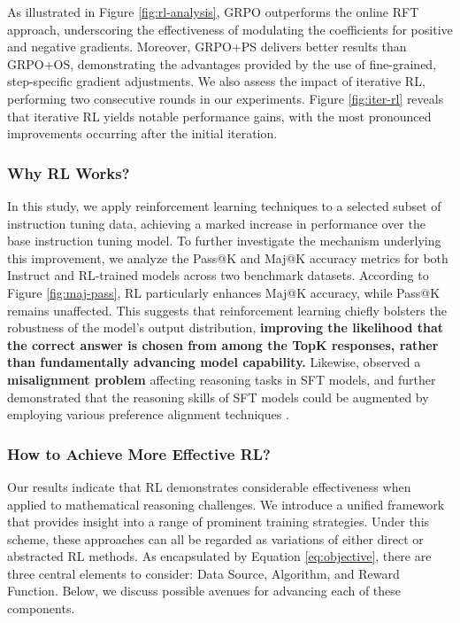 \begin{itemize}[topsep=0pt]
\begin{itemize}[topsep=0pt]
As illustrated in Figure \ref{fig:rl-analysis}, GRPO outperforms the online RFT approach, underscoring the effectiveness of modulating the coefficients for positive and negative gradients. Moreover, GRPO+PS delivers better results than GRPO+OS, demonstrating the advantages provided by the use of fine-grained, step-specific gradient adjustments. We also assess the impact of iterative RL, performing two consecutive rounds in our experiments. Figure \ref{fig:iter-rl} reveals that iterative RL yields notable performance gains, with the most pronounced improvements occurring after the initial iteration.

\subsubsection{Why RL Works?} In this study, we apply reinforcement learning techniques to a selected subset of instruction tuning data, achieving a marked increase in performance over the base instruction tuning model. To further investigate the mechanism underlying this improvement, we analyze the Pass@K and Maj@K accuracy metrics for both Instruct and RL-trained models across two benchmark datasets. According to Figure \ref{fig:maj-pass}, RL particularly enhances Maj@K accuracy, while Pass@K remains unaffected. This suggests that reinforcement learning chiefly bolsters the robustness of the model’s output distribution, \textbf{improving the likelihood that the correct answer is chosen from among the TopK responses, rather than fundamentally advancing model capability.} Likewise, \citep{wang2023making} observed a \textbf{misalignment problem} affecting reasoning tasks in SFT models, and further demonstrated that the reasoning skills of SFT models could be augmented by employing various preference alignment techniques \citep{yuan2023rrhf,song2023preference,wang2023making}.

\subsubsection{How to Achieve More Effective RL?}
\label{sec:effec_rl}
Our results indicate that RL demonstrates considerable effectiveness when applied to mathematical reasoning challenges. We introduce a unified framework that provides insight into a range of prominent training strategies. Under this scheme, these approaches can all be regarded as variations of either direct or abstracted RL methods. As encapsulated by Equation \ref{eq:objective}, there are three central elements to consider: Data Source, Algorithm, and Reward Function. Below, we discuss possible avenues for advancing each of these components.


\end{itemize}
\end{itemize}
